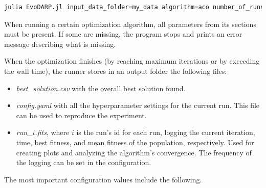 \begin{lstlisting}[language=bash, breaklines=true]
    julia EvoDARP.jl input_data_folder=my_data algorithm=aco number_of_runs=10 num_ants=10 num_iterations=10000
\end{lstlisting}

When running a certain optimization algorithm, all parameters from its sections must be present. If some are missing, the program stops and prints an error message describing what is missing.

When the optimization finishes (by reaching maximum iterations or by exceeding the wall time), the runner stores in an output folder the following files:

\begin{itemize}
    \setlength\itemsep{0pt}
    \item \textit{best\_solution.csv} with the overall best solution found.
    \item \textit{config.yaml} with all the hyperparameter settings for the current run. This file can be used to reproduce the experiment.
    \item \textit{run\_$i$.fits}, where $i$ is the run's id for each run, logging the current iteration, time, best fitness, and mean fitness of the population, respectively. Used for creating plots and analyzing the algorithm's convergence. The frequency of the logging can be set in the configuration.
\end{itemize}

The most important configuration values include the following.

